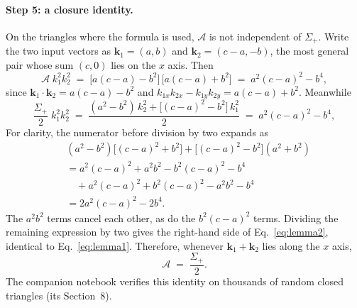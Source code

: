 \documentclass[11pt]{article}
\newcommand{\bk}{\boldsymbol{k}}
\numberwithin{equation}{section}
\begin{document}
\paragraph{Step 5: a closure identity.}
On the triangles where the formula is used, $\mathcal{A}$ is not
independent of $\Sigma_+$.  Write the two input vectors as
$\bk_1 = (a, b)$ and $\bk_2 = (c - a, -b)$, the most general pair
whose sum $(c, 0)$ lies on the $x$ axis.  Then
\begin{equation}
  \mathcal{A}\; k_1^2 k_2^2
  \;=\;
  \bigl[a(c-a) - b^2\bigr]\,\bigl[a(c-a) + b^2\bigr]
  \;=\; a^2 (c-a)^2 - b^4 ,
  \label{eq:lemma1}
\end{equation}
since $\bk_1\!\cdot\!\bk_2 = a(c-a) - b^2$ and
$k_{1x}k_{2x} - k_{1y}k_{2y} = a(c-a) + b^2$.  Meanwhile
\begin{equation}
  \frac{\Sigma_+}{2}\; k_1^2 k_2^2
  \;=\; \frac{(a^2 - b^2)\,k_2^2
  + \bigl[(c-a)^2 - b^2\bigr]\,k_1^2}{2}
  \;=\; a^2 (c-a)^2 - b^4 ,
  \label{eq:lemma2}
\end{equation}
For clarity, the numerator before division by two expands as
\begin{equation}
\begin{split}
 &(a^2-b^2)\bigl[(c-a)^2+b^2\bigr]
 +\bigl[(c-a)^2-b^2\bigr](a^2+b^2)\\
 &=a^2(c-a)^2+a^2b^2-b^2(c-a)^2-b^4\\
 &\quad+a^2(c-a)^2+b^2(c-a)^2-a^2b^2-b^4\\
 &=2a^2(c-a)^2-2b^4.
\end{split}
\end{equation}
The $a^2b^2$ terms cancel each other, as do the $b^2(c-a)^2$ terms.
Dividing the remaining expression by two gives the right-hand side of
Eq.~\eqref{eq:lemma2}, identical to Eq.~\eqref{eq:lemma1}.
Therefore, whenever
$\bk_1 + \bk_2$ lies along the $x$ axis,
\begin{equation}
  \mathcal{A} \;=\; \frac{\Sigma_+}{2} .
  \label{eq:closureidentity}
\end{equation}
The companion notebook verifies this identity on thousands of random
closed triangles (its Section~8).
\end{document}
